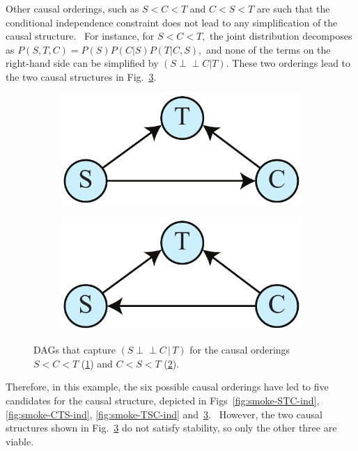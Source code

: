 \documentclass[12pt,onecolumn,nofootinbib]{revtex4-2}
\def\indep{\perp\!\!\!\!\perp}
\begin{document}
Other causal orderings, such as $S<C<T$ and $C<S<T$ are such that the
conditional independence constraint does not lead to any simplification of
the causal structure. \ For instance, for $S<C<T,$ the joint distribution
decomposes as $P(S,T,C)=P(S)P(C|S)P(T|C,S),$ and none of the terms on the
right-hand side can be simplified by $(S\indep C|T).$  These two orderings lead to the two causal structures in Fig.~\ref{fig:smoke-SCT-CST}.
\begin{figure}[h]
        \begin{subfigure}[b]{0.2\textwidth}
                	\centering
                	\includegraphics[width=\textwidth]{smoke-SCT}
		\caption{}
                	\label{fig:smoke-SCT}
	\end{subfigure}
        \quad
        \begin{subfigure}[b]{0.2\textwidth}
                	\centering
                	\includegraphics[width=\textwidth]{smoke-CST}
            	\caption{}
                	\label{fig:smoke-CST}
        \end{subfigure}
        \caption{DAGs that capture $(S\indep C\,|\, T)$ for the causal orderings $S<C<T$ (\ref{fig:smoke-SCT}) and $C<S<T$ (\ref{fig:smoke-CST}).}
        \label{fig:smoke-SCT-CST}
\end{figure}

Therefore, in this example, the six possible causal orderings have led to five candidates for the causal structure, depicted in Figs~\ref{fig:smoke-STC-ind}, \ref{fig:smoke-CTS-ind}, \ref{fig:smoke-TSC-ind} and~\ref{fig:smoke-SCT-CST}. \ However, the two causal structures shown in Fig.~\ref{fig:smoke-SCT-CST} do not satisfy stability, so only the other three are viable.
\end{document}
